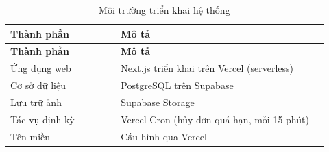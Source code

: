 \begin{longtable}{|>{\raggedright\arraybackslash}p{0.32\linewidth}|>{\raggedright\arraybackslash}p{0.60\linewidth}|}
\caption{Môi trường triển khai hệ thống}\label{tab:deploy}\\
\hline
\rowcolor{gray!12}\textbf{Thành phần} & \textbf{Mô tả} \\ \hline
\endfirsthead
\hline
\rowcolor{gray!12}\textbf{Thành phần} & \textbf{Mô tả} \\ \hline
\endhead
Ứng dụng web & Next.js triển khai trên Vercel (serverless) \\ \hline
Cơ sở dữ liệu & PostgreSQL trên Supabase \\ \hline
Lưu trữ ảnh & Supabase Storage \\ \hline
Tác vụ định kỳ & Vercel Cron (hủy đơn quá hạn, mỗi 15 phút) \\ \hline
Tên miền & Cấu hình qua Vercel \\ \hline
\end{longtable}
